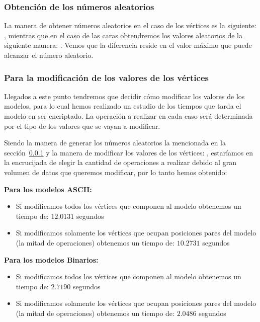 \subsubsection{Obtención de los números aleatorios}\label{sec:numero-aleatorio}
La manera de obtener números aleatorios en el caso de los vértices es la siguiente: , mientras que en el caso de las caras obtendremos los valores aleatorios de la siguiente manera: . Vemos que la diferencia reside en el valor máximo que puede alcanzar el número aleatorio.

\subsubsection{Para la modificación de los valores de los vértices}
Llegados a este punto tendremos que decidir cómo modificar los valores de los modelos, para lo cual hemos realizado un estudio de los tiempos que tarda el modelo en ser encriptado. La operación a realizar en cada caso será determinada por el tipo de los valores que se vayan a modificar.

Siendo la manera de generar los números aleatorios la mencionada en la sección~\ref{sec:numero-aleatorio} y la manera de modificar los valores de los vértices: , estaríamos en la encrucijada de elegir la cantidad de operaciones a realizar debido al gran volumen de datos que queremos modificar, por lo tanto hemos obtenido:

\textbf{Para los modelos ASCII:}
\begin{itemize}
	\item Si modificamos todos los vértices que componen al modelo obtenemos un tiempo de: $12.0131$ segundos
	\item Si modificamos solamente los vértices que ocupan posiciones pares del modelo (la mitad de operaciones) obtenemos un tiempo de: $10.2731$ segundos
\end{itemize}

\textbf{Para los modelos Binarios:}
\begin{itemize}
	\item Si modificamos todos los vértices que componen al modelo obtenemos un tiempo de: $2.7190$ segundos
	\item Si modificamos solamente los vértices que ocupan posiciones pares del modelo (la mitad de operaciones) obtenemos un tiempo de: $2.0486$ segundos
\end{itemize}

